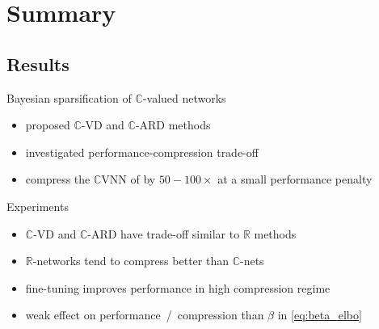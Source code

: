 \documentclass{beamer}
\newcommand{\real}{\mathbb{R}}
\newcommand{\cplx}{\mathbb{C}}
\begin{document}

\section{Summary} %
\label{sec:summary}

\subsection{Results} %
\label{sub:results}

\begin{frame}[c]{\insertsubsection}{\insertsection}
  Bayesian sparsification of $\cplx$-valued networks
  \begin{itemize}
    \item proposed $\cplx$-VD and $\cplx$-ARD methods
    \item investigated performance-compression trade-off
    \item compress the $\cplx$VNN of \citet{trabelsi_deep_2018}
    by $50-100\times$ at a small performance penalty
  \end{itemize}

  \pause
  \medskip
  Experiments
  \begin{itemize}
    \item $\cplx$-VD and $\cplx$-ARD have trade-off similar to $\real$ methods
    \smallskip
    \item $\real$-networks tend to compress better than $\cplx$-nets
    \smallskip
    \item fine-tuning improves performance in high compression regime
    \smallskip
    \item weak effect on performance~/~compression than $\beta$ in \eqref{eq:beta_elbo}
  \end{itemize}


\end{frame}
\end{document}
